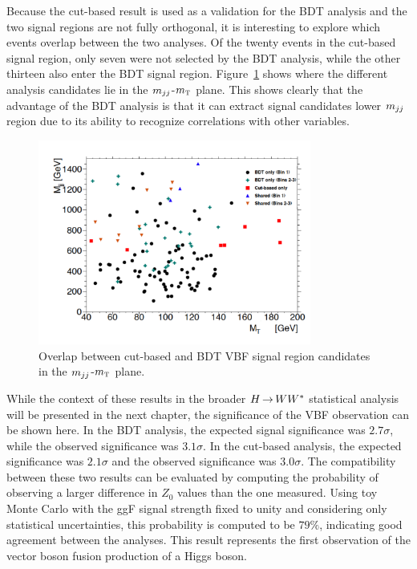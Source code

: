 Because the cut-based result is used as a validation for the BDT analysis and the two signal regions are not fully orthogonal, it is interesting to explore which events overlap between the two analyses. Of the twenty events in the cut-based signal region, only seven were not selected by the BDT analysis, while the other thirteen also enter the BDT signal region. Figure~\ref{fig:vbf_bdt_cb_overlay} shows where the different analysis candidates lie in the $m_{jj}$-$m_{\textrm{\footnotesize\sc t}}$ plane. This shows clearly that the advantage of the BDT analysis is that it can extract signal candidates lower $m_{jj}$ region due to its ability to recognize correlations with other variables. 

\begin{figure}[h!]
  \centering
  \captionsetup{justification=centering}
  \includegraphics[width=0.8\textwidth]{figures/OverlapFig}
  \caption{Overlap between cut-based and BDT VBF signal region candidates in the $m_{jj}$-$m_{\textrm{\footnotesize\sc t}}$ plane.}
  \label{fig:vbf_bdt_cb_overlay}
\end{figure}

While the context of these results in the broader $H{\,{\rightarrow}\,}WW^\ast$ statistical analysis will be presented in the next chapter, the significance of the VBF observation can be shown here. In the BDT analysis, the expected signal significance was $2.7\sigma$, while the observed significance was $3.1\sigma$. In the cut-based analysis, the expected significance was $2.1\sigma$ and the observed significance was $3.0\sigma$. The compatibility between these two results can be evaluated by computing the probability of observing a larger difference in $Z_0$ values than the one measured. Using toy Monte Carlo with the ggF signal strength fixed to unity and considering only statistical uncertainties, this probability is computed to be $79\%$, indicating good agreement between the analyses. This result represents the first observation of the vector boson fusion production of a Higgs boson. 
